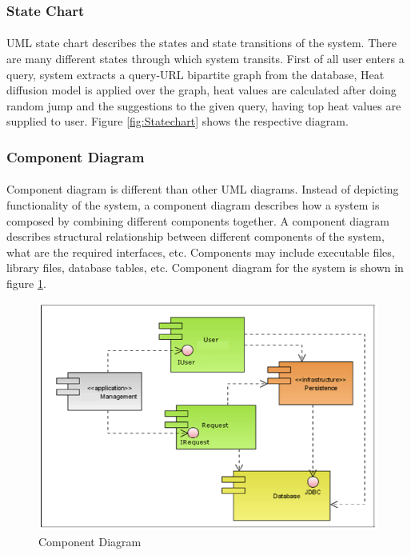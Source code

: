 \subsubsection{State Chart}
\paragraph{}UML state chart describes the states and state transitions of the system. There are many different states through which system transits. First of all user enters a query, system extracts a query-URL bipartite graph from the database, Heat diffusion model is applied over the graph, heat values are calculated after doing random jump and the suggestions to the given query, having top heat values are supplied to user. Figure \ref{fig:Statechart} shows the respective diagram.
\newpage
\subsubsection{Component Diagram}
\paragraph{}Component diagram is different than other UML diagrams. Instead of depicting functionality of the system, a component diagram describes how a system is composed by combining different components together. A component diagram describes structural relationship between different components of the system, what are the required interfaces, etc. Components may include executable files, library files, database tables, etc. Component diagram for the system is shown in figure \ref{fig:Component}.
\vspace{.25in}
\begin{figure}[h!]
\centering
\includegraphics[width=.95\linewidth]{./comp}
\caption{Component Diagram}
\label{fig:Component}
\end{figure}


